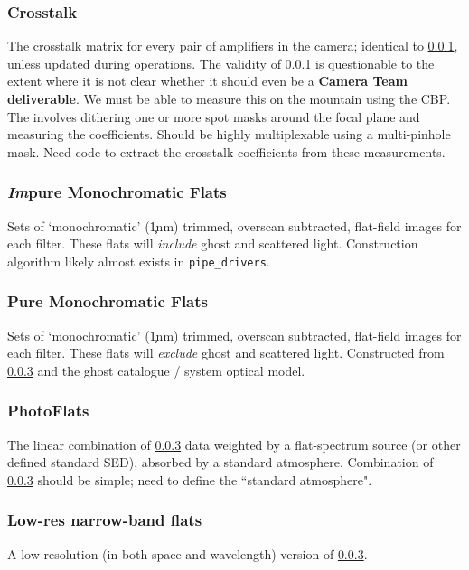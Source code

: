 \subsubsection{Crosstalk}\label{calibProducts:crosstalk}
The crosstalk matrix for every pair of amplifiers in the camera; identical to \ref{calibProducts:crosstalk}, unless updated during operations.
\alg The validity of \ref{calibProducts:crosstalk} is questionable to the extent where it is not clear whether it should even be a \textbf{Camera Team deliverable}. We must be able to measure this on the mountain using the CBP. The involves dithering one or more spot masks around the focal plane and measuring the coefficients. Should be highly multiplexable using a multi-pinhole mask. Need code to extract the crosstalk coefficients from these measurements.


\subsubsection{\emph{Im}pure Monochromatic Flats}\label{calibProducts:monoFlat}
Sets of `monochromatic' (\c 1nm) trimmed, overscan subtracted, flat-field images for each filter.  These flats will \textit{include} ghost and scattered light.
\alg Construction algorithm likely almost exists in \texttt{pipe\_drivers}.


\subsubsection{Pure Monochromatic Flats}\label{calibProducts:monoPhotoFlat}
Sets of `monochromatic' (\c 1nm) trimmed, overscan subtracted, flat-field images for each filter.  These flats will \textit{exclude} ghost and scattered light.
\alg Constructed from \ref{calibProducts:monoPhotoFlat} and the ghost catalogue / system optical model.


\subsubsection{PhotoFlats}\label{calibProducts:standardPhotoFlat}
The linear combination of \ref{calibProducts:monoPhotoFlat} data weighted by a flat-spectrum source (or other defined standard SED), absorbed by a standard atmosphere.
\alg Combination of \ref{calibProducts:monoPhotoFlat} should be simple; need to define the ``standard atmosphere".


\subsubsection{Low-res narrow-band flats}\label{calibProducts:monoPhotoFlatLowRes}
A low-resolution (in both space and wavelength) version of  \ref{calibProducts:monoPhotoFlat}.
\alg {}


